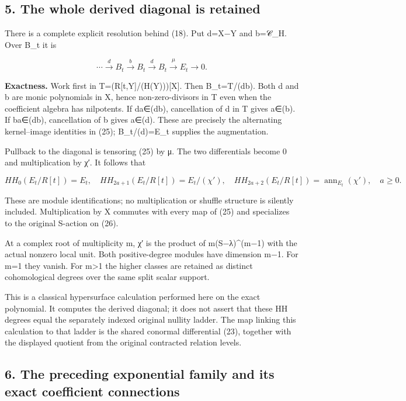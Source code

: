 \subsection{5. The whole derived diagonal is retained}\label{endpoint-sga_trace_period--the-whole-derived-diagonal-is-retained}

There is a complete explicit resolution behind (18). Put d=X−Y and b=𝒞\_H. Over B\_t it is

\[
\cdots\xrightarrow{d}B_t\xrightarrow{b}B_t
\xrightarrow{d}B_t\xrightarrow{\mu}E_t\longrightarrow0.
\tag{25}
\]

\textbf{Exactness.} Work first in T=(R{[}t,Y{]}/(H(Y))){[}X{]}. Then B\_t=T/(db). Both d and b are monic polynomials in X, hence non-zero-divisors in T even when the coefficient algebra has nilpotents. If da∈(db), cancellation of d in T gives a∈(b). If ba∈(db), cancellation of b gives a∈(d). These are precisely the alternating kernel--image identities in (25); B\_t/(d)=E\_t supplies the augmentation.

Pullback to the diagonal is tensoring (25) by μ. The two differentials become 0 and multiplication by χ′. It follows that

\[
HH_0(E_t/R[t])=E_t,
\quad HH_{2a+1}(E_t/R[t])=E_t/(\chi'),
\quad HH_{2a+2}(E_t/R[t])=\operatorname{ann}_{E_t}(\chi'),
\quad a\ge0.
\tag{26}
\]

These are module identifications; no multiplication or shuffle structure is silently included. Multiplication by X commutes with every map of (25) and specializes to the original S-action on (26).

At a complex root of multiplicity m, χ′ is the product of m(S−λ)\^{}(m−1) with the actual nonzero local unit. Both positive-degree modules have dimension m−1. For m=1 they vanish. For m\textgreater1 the higher classes are retained as distinct cohomological degrees over the same split scalar support.

This is a classical hypersurface calculation performed here on the exact polynomial. It computes the derived diagonal; it does not assert that these HH degrees equal the separately indexed original nullity ladder. The map linking this calculation to that ladder is the shared conormal differential (23), together with the displayed quotient from the original contracted relation levels.

\subsection{6. The preceding exponential family and its exact coefficient connections}\label{endpoint-sga_trace_period--the-preceding-exponential-family-and-its-exact-coefficient-connections}

